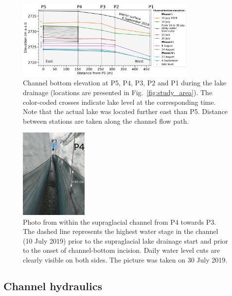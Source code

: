 \begin{figure}[h]
    \centering
    \includegraphics[width=0.8\textwidth]{chapters/chapter_plainemorte/fig03.pdf}
    \caption{Channel bottom elevation at P5, P4, P3, P2 and P1 during the lake drainage (locations are presented in Fig.~\ref{fig:study_area}). The color-coded crosses indicate lake level at the corresponding time.  Note that the actual lake was located further east than P5.  Distance between stations are taken along the channel flow path.}
    \label{canal_profile}
\end{figure}

\FloatBarrier

\begin{figure}[h]
    \centering
    \includegraphics[width=0.3\textwidth]{chapters/chapter_plainemorte/fig04.pdf}
    \caption{Photo from within the supraglacial channel from P4 towards P3. The dashed line represents the highest water stage in the channel (10 July 2019) prior to the supraglacial lake drainage start and prior to the onset of channel-bottom incision. Daily water level cuts are clearly visible on both sides. The picture was taken on 30 July 2019.}
    \label{fig:picture_channel}
\end{figure}

\FloatBarrier

\subsection{Channel hydraulics}


